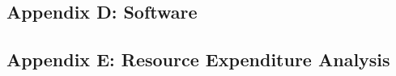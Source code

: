 \documentclass[12pt]{article}
\begin{document}
\subsection*{Appendix D: Software}

\subsection*{Appendix E: Resource Expenditure Analysis}
\end{document}
